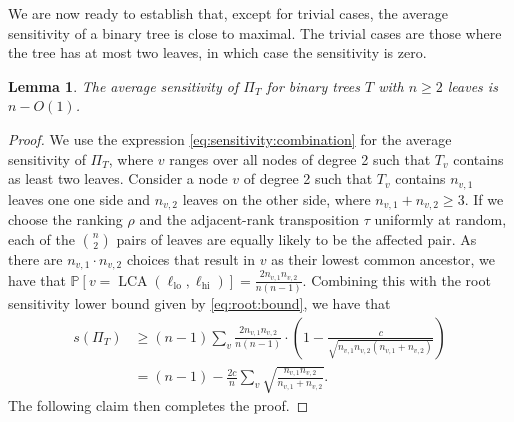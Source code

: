 \documentclass[11pt]{article}
\numberwithin{equation}{section}
\newtheorem{lemma}[theorem]{Lemma}
\theoremstyle{definition}
\theoremstyle{plain}
\DeclareMathOperator{\LCA}{LCA}
\renewcommand{\Pr}{\mathbb{P}}
\newcommand{\ranking}{\rho}
\newcommand{\transposition}{\tau}
\newcommand{\lo}{\mathrm{lo}}
\newcommand{\hi}{\mathrm{hi}}
\begin{document}
We are now ready to establish that, except for trivial cases, the average sensitivity of a binary tree is close to maximal. The trivial cases are those where the tree has at most two leaves, in which case the sensitivity is zero. 
\begin{lemma}
\label{lemma:sensitivity:binary}
The average sensitivity of $\Pi_T$ for binary trees $T$ with $n \ge 2$ leaves is $n-O(1)$.
\end{lemma}
\begin{proof}
We use the expression \eqref{eq:sensitivity:combination} for the average sensitivity of $\Pi_T$, where $v$ ranges over all nodes of degree 2 such that $T_v$ contains as least two leaves.
Consider a node $v$ of degree 2 such that $T_v$ contains $n_{v,1}$ leaves one one side and $n_{v,2}$ leaves on the other side, where $n_{v,1}+n_{v,2} \ge 3$. If we choose the ranking $\ranking$ and the adjacent-rank transposition $\transposition$ uniformly at random, each of the $\binom{n}{2}$ pairs of leaves are equally likely to be the affected pair. As there are $n_{v,1} \cdot n_{v,2}$ choices that result in $v$ as their lowest common ancestor, we have that
$\Pr[ v = \LCA(\ell_\lo,\ell_\hi) ] = \frac{2 n_{v,1} n_{v,2}}{n(n-1)}$. Combining this with the root sensitivity lower bound given by \eqref{eq:root:bound}, we have that
\begin{align*} 
s(\Pi_T) & \ge (n-1) \sum_v \frac{2 n_{v,1} n_{v,2}}{n(n-1)} \cdot \left( 1 - \frac{c}{\sqrt{n_{v,1} n_{v,2} (n_{v,1}+n_{v,2})}} \right)  \\
& = (n-1) - \frac{2c}{n} \sum_v \sqrt{\frac{n_{v,1} n_{v,2}}{n_{v,1}+n_{v,2}}}. 
\end{align*}
The following claim then completes the proof.
\end{proof}
\end{document}
